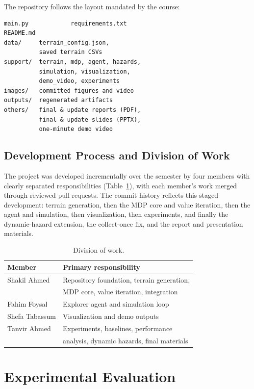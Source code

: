 \documentclass[conference]{IEEEtran}
\begin{document}
The repository follows the layout mandated by the course:

\begin{verbatim}
main.py            requirements.txt
README.md
data/     terrain_config.json,
          saved terrain CSVs
support/  terrain, mdp, agent, hazards,
          simulation, visualization,
          demo_video, experiments
images/   committed figures and video
outputs/  regenerated artifacts
others/   final & update reports (PDF),
          final & update slides (PPTX),
          one-minute demo video
\end{verbatim}

\subsection{Development Process and Division of Work}

The project was developed incrementally over the semester by four members with clearly separated responsibilities (Table~\ref{tab:work}), with each member's work merged through reviewed pull requests. The commit history reflects this staged development: terrain generation, then the MDP core and value iteration, then the agent and simulation, then visualization, then experiments, and finally the dynamic-hazard extension, the collect-once fix, and the report and presentation materials.

\begin{table}[t]
  \caption{Division of work.}
  \label{tab:work}
  \centering
  \setlength{\tabcolsep}{5pt}
  \begin{tabular}{ll}
    \toprule
    Member & Primary responsibility \\
    \midrule
    Shakil Ahmed   & Repository foundation, terrain generation, \\
                   & MDP core, value iteration, integration \\
    Fahim Foysal   & Explorer agent and simulation loop \\
    Shefa Tabassum & Visualization and demo outputs \\
    Tanvir Ahmed   & Experiments, baselines, performance \\
                   & analysis, dynamic hazards, final materials \\
    \bottomrule
  \end{tabular}
\end{table}

\section{Experimental Evaluation}\label{sec:experiments}
\end{document}
